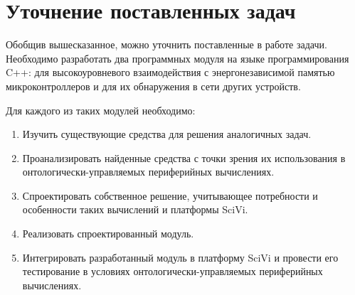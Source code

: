 \section{Уточнение поставленных задач}

Обобщив вышесказанное, можно уточнить поставленные в работе задачи.
Необходимо разработать два программных модуля на языке программирования C++: для высокоуровневого взаимодействия с энергонезависимой памятью микроконтроллеров и для их обнаружения в сети других устройств.

Для каждого из таких модулей необходимо:
\begin{enumerate}
	\item Изучить существующие средства для решения аналогичных задач.
	\item Проанализировать найденные средства с точки зрения их использования в онтологически-управляемых периферийных вычислениях.
	\item Спроектировать собственное решение, учитывающее потребности и особенности таких вычислений и платформы SciVi.
	\item Реализовать спроектированный модуль.
	\item Интегрировать разработанный модуль в платформу SciVi и провести его тестирование в условиях онтологически-управляемых периферийных вычислениях.
\end{enumerate}

